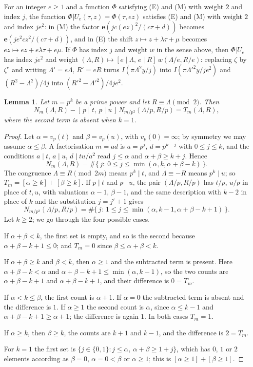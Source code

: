 \documentclass[11pt]{amsart}
\newtheorem{lemma}[theorem]{Lemma}
\theoremstyle{definition}
\newcommand{\e}{\mathbf{e}}
\begin{document}
For an integer $e\ge1$ and a function $\Phi$ satisfying (E) and (M) with weight $2$ and index $j$, the function $\Phi|U_e(\tau,z)=\Phi(\tau,ez)$ satisfies (E) and (M) with weight $2$ and index $je^2$: in (M) the factor $\e(jc(ez)^2/(c\tau+d))$ becomes $\e(je^2cz^2/(c\tau+d))$, and in (E) the shift $z\mapsto z+\lambda\tau+\mu$ becomes $ez\mapsto ez+e\lambda\tau+e\mu$. If $\Phi$ has index $j$ and weight $w$ in the sense above, then $\Phi|U_e$ has index $je^2$ and weight $(\Lambda,R)\mapsto[e\mid\Lambda,\,e\mid R]\,w(\Lambda/e,R/e)$: replacing $\zeta$ by $\zeta^e$ and writing $\Lambda'=e\Lambda$, $R'=eR$ turns $I(\pi\Lambda^2y/j)$ into $I(\pi\Lambda'^2y/je^2)$ and $(R^2-\Lambda^2)/4j$ into $(R'^2-\Lambda'^2)/4je^2$.

\begin{lemma}\label{lem:count}
Let $m=p^k$ be a prime power and let $R\equiv\Lambda\pmod 2$. Then
\[
N_m(\Lambda,R)-[\,p\mid t,\ p\mid u\,]\,N_{m/p^2}(\Lambda/p,R/p)=T_m(\Lambda,R),
\]
where the second term is absent when $k=1$.
\end{lemma}

\begin{proof}
Let $\alpha=v_p(t)$ and $\beta=v_p(u)$, with $v_p(0)=\infty$; by symmetry we may assume $\alpha\le\beta$. A factorisation $m=ad$ is $a=p^j$, $d=p^{k-j}$ with $0\le j\le k$, and the conditions $a\mid t$, $a\mid u$, $d\mid tu/a^2$ read $j\le\alpha$ and $\alpha+\beta\ge k+j$. Hence
\[
N_m(\Lambda,R)=\#\{\,j:\ 0\le j\le\min(\alpha,k,\alpha+\beta-k)\,\}.
\]
The congruence $\Lambda\equiv R\pmod{2m}$ means $p^k\mid t$, and $\Lambda\equiv-R$ means $p^k\mid u$; so $T_m=[\alpha\ge k]+[\beta\ge k]$. If $p\mid t$ and $p\mid u$, the pair $(\Lambda/p,R/p)$ has $t/p$, $u/p$ in place of $t,u$, with valuations $\alpha-1$, $\beta-1$, and the same description with $k-2$ in place of $k$ and the substitution $j=j'+1$ gives
\[
N_{m/p^2}(\Lambda/p,R/p)=\#\{\,j:\ 1\le j\le\min(\alpha,k-1,\alpha+\beta-k+1)\,\}.
\]
Let $k\ge2$; we go through the four possible cases.

If $\alpha+\beta<k$, the first set is empty, and so is the second because $\alpha+\beta-k+1\le0$; and $T_m=0$ since $\beta\le\alpha+\beta<k$.

If $\alpha+\beta\ge k$ and $\beta<k$, then $\alpha\ge1$ and the subtracted term is present. Here $\alpha+\beta-k<\alpha$ and $\alpha+\beta-k+1\le\min(\alpha,k-1)$, so the two counts are $\alpha+\beta-k+1$ and $\alpha+\beta-k+1$, and their difference is $0=T_m$.

If $\alpha<k\le\beta$, the first count is $\alpha+1$. If $\alpha=0$ the subtracted term is absent and the difference is $1$. If $\alpha\ge1$ the second count is $\alpha$, since $\alpha\le k-1$ and $\alpha+\beta-k+1\ge\alpha+1$; the difference is again $1$. In both cases $T_m=1$.

If $\alpha\ge k$, then $\beta\ge k$, the counts are $k+1$ and $k-1$, and the difference is $2=T_m$.

For $k=1$ the first set is $\{j\in\{0,1\}:j\le\alpha,\ \alpha+\beta\ge1+j\}$, which has $0$, $1$ or $2$ elements according as $\beta=0$, $\alpha=0<\beta$ or $\alpha\ge1$; this is $[\alpha\ge1]+[\beta\ge1]$.
\end{proof}
\end{document}
